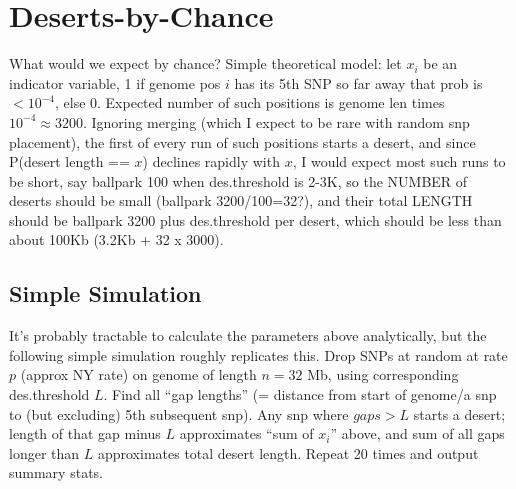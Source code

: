 \documentclass{article}\usepackage[]{graphicx}\usepackage[]{color}
\begin{document}
\section{Deserts-by-Chance}
\label{sec:sim}

What would we expect by chance?  Simple theoretical model: let $x_i$ be an indicator variable, 1 if genome pos $i$ has its 5th SNP so far away that prob is $<10^{-4}$, else 0.  Expected number of such positions is genome len times $10^{-4}\approx3200$.  Ignoring merging (which I expect to be rare with random snp placement), the first of every run of such positions starts a desert, and since P(desert length == $x$) declines rapidly with $x$, I would expect most such runs to be short, say ballpark 100 when des.threshold is 2-3K, so the NUMBER of deserts should be small (ballpark 3200/100=32?), and their total LENGTH should be ballpark 3200 plus des.threshold per desert, which should be less than about 100Kb (3.2Kb + 32 x 3000).

\subsection{Simple Simulation}
It's probably tractable to calculate the parameters above analytically, but the following simple simulation roughly replicates this.  Drop SNPs at random at rate $p$ (approx NY rate) on genome of length $n=32$ Mb, using corresponding des.threshold $L$.  Find all ``gap lengths'' (= distance from start of genome/a snp to (but excluding) 5th subsequent snp). Any snp where $gaps > L$ starts a desert; length of that gap minus $L$ approximates ``sum of $x_i$'' above, and sum of all gaps longer than $L$ approximates total desert length.  Repeat 20 times and output summary stats. 
\end{document}
